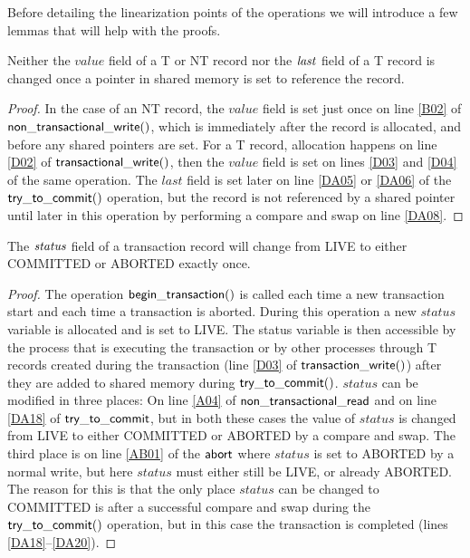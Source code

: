 Before detailing the linearization points of the operations we will introduce a few lemmas that will help
with the proofs.

\begin{lemma}
\label{lemma:si-nochange}
Neither the $\mathit{value}$ field of a T or NT record nor the $\ms{last}$ field of a T record is changed once a pointer in shared memory is set to 
reference the record.
\end{lemma}
\begin{proof}
In the case of an NT record, the $\mathit{value}$ field is set just once on line \ref{B02} of $\sf{non\_transactional\_write}()$,
which is immediately after the record is allocated, and before any shared pointers are set.
For a T record, allocation happens on line \ref{D02} of $\sf{transactional\_write}()$,
then the $\mathit{value}$ field is set on lines \ref{D03} and \ref{D04} of the same operation.
The $\mathit{last}$ field is set later on line \ref{DA05} or \ref{DA06} of the $\sf{try\_to\_commit}()$ operation,
but the record is not referenced by a shared pointer until later in this operation
by performing a compare and swap on line \ref{DA08}.
\end{proof}


\begin{lemma}
\label{lemma:si-statusonce}
The $\ms{status}$ field of a transaction record will change from LIVE to either COMMITTED or ABORTED
exactly once.
\end{lemma}
\begin{proof}
The operation $\sf{begin\_transaction}()$ is called each time a new transaction start and each time a transaction is aborted.
During this operation a new $\mathit{status}$ variable is allocated and is set to LIVE.
The status variable is then accessible by the process that is executing the transaction or by other processes through T records created during the
transaction (line \ref{D03} of $\sf{transaction\_write}()$) after they are added to shared memory during $\sf{try\_to\_commit}()$.
$\mathit{status}$ can be modified in three places:
On line \ref{A04} of $\sf{non\_transactional\_read}$ and on line \ref{DA18} of $\sf{try\_to\_commit}$, but in both these cases
the value of $\mathit{status}$ is changed from LIVE to either COMMITTED or ABORTED by a compare and swap.
The third place is on line \ref{AB01} of the $\sf{abort}$ where $\mathit{status}$ is set to ABORTED by a normal write, but
here $\mathit{status}$ must either still be LIVE, or already ABORTED.
The reason for this is that the only place $\mathit{status}$ can be changed to COMMITTED is after a successful compare and swap
during the $\sf{try\_to\_commit}()$ operation, but in this case the transaction is completed (lines \ref{DA18}--\ref{DA20}).
\end{proof}

